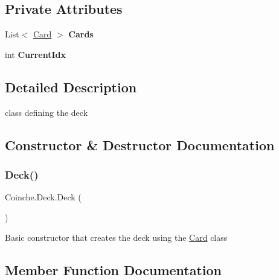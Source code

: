 \subsection*{Private Attributes}
\begin{DoxyCompactItemize}
\item 
\mbox{\label{class_coinche_1_1_deck_a170dcb10375fd76ccf402d5497bc3d3c}} 
List$<$ \hyperlink{class_coinche_1_1_card}{Card} $>$ {\bfseries Cards}
\item 
\mbox{\label{class_coinche_1_1_deck_ada51a1a06a19bb98f169ff69eab741bf}} 
int {\bfseries Current\+Idx}
\end{DoxyCompactItemize}


\subsection{Detailed Description}
class defining the deck 



\subsection{Constructor \& Destructor Documentation}
\mbox{\label{class_coinche_1_1_deck_a63fabc6c73f999e4cc1fd55e368f6a30}} 
\subsubsection{\texorpdfstring{Deck()}{Deck()}}
{\footnotesize\ttfamily Coinche.\+Deck.\+Deck (\begin{DoxyParamCaption}{ }\end{DoxyParamCaption})\hspace{0.3cm}{\ttfamily [inline]}}



Basic constructor that creates the deck using the \hyperlink{class_coinche_1_1_card}{Card} class 



\subsection{Member Function Documentation}
\mbox{\label{class_coinche_1_1_deck_a1f56a0aeaa64e994350b1c5662c36b5f}} 
